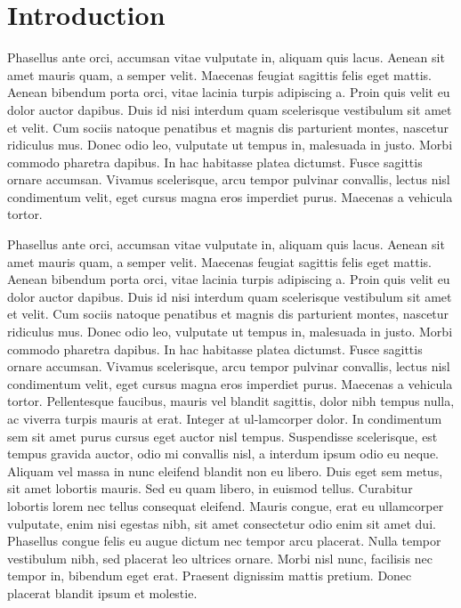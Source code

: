 \documentclass[colTwo]{IIR}
\theoremstyle{definition}
\begin{document}
 
\section{Introduction}
Phasellus ante orci, accumsan vitae vulputate in, aliquam quis lacus. Aenean sit amet mauris quam, a semper velit. Maecenas feugiat sagittis felis eget mattis. Aenean bibendum porta orci, vitae lacinia turpis adipiscing a. Proin quis velit eu dolor auctor dapibus. Duis id nisi interdum quam scelerisque vestibulum sit amet et velit. Cum sociis natoque penatibus et magnis dis parturient montes, nascetur ridiculus mus. Donec odio leo, vulputate ut tempus in, malesuada in justo. Morbi commodo pharetra dapibus. In hac habitasse platea dictumst. Fusce sagittis ornare accumsan. Vivamus scelerisque, arcu tempor pulvinar convallis, lectus nisl condimentum velit, eget cursus magna eros imperdiet purus. Maecenas a vehicula tortor.

Phasellus ante orci, accumsan vitae vulputate in, aliquam quis lacus. Aenean sit amet mauris quam, a semper velit. Maecenas feugiat sagittis felis eget mattis. Aenean bibendum porta orci, vitae lacinia turpis adipiscing a. Proin quis velit eu dolor auctor dapibus. Duis id nisi interdum quam scelerisque vestibulum sit amet et velit. Cum sociis natoque penatibus et magnis dis parturient montes, nascetur ridiculus mus. Donec odio leo, vulputate ut tempus in, malesuada in justo. Morbi commodo pharetra dapibus. In hac habitasse platea dictumst. Fusce sagittis ornare accumsan. Vivamus scelerisque, arcu tempor pulvinar convallis, lectus nisl condimentum velit, eget cursus magna eros imperdiet purus. Maecenas a vehicula tortor.
Pellentesque faucibus, mauris vel blandit sagittis, dolor nibh tempus nulla, ac viverra turpis mauris at erat. Integer at ul-lamcorper dolor. In condimentum sem sit amet purus cursus eget auctor nisl tempus. Suspendisse scelerisque, est tempus gravida auctor, odio mi convallis nisl, a interdum ipsum odio eu neque. Aliquam vel massa in nunc eleifend blandit non eu libero. Duis eget sem metus, sit amet lobortis mauris. Sed eu quam libero, in euismod tellus. Curabitur lobortis lorem nec tellus consequat eleifend. Mauris congue, erat eu ullamcorper vulputate, enim nisi egestas nibh, sit amet consectetur odio enim sit amet dui. Phasellus congue felis eu augue dictum nec tempor arcu placerat. Nulla tempor vestibulum nibh, sed placerat leo ultrices ornare. Morbi nisl nunc, facilisis nec tempor in, bibendum eget erat. Praesent dignissim mattis pretium. Donec placerat blandit ipsum et molestie.
\end{document}
